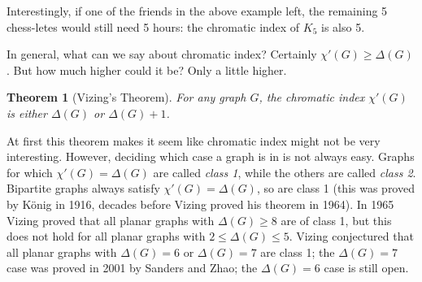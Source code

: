 \documentclass[10pt,]{book}
\theoremstyle{plain}
\newtheorem{theorem}{Theorem}[section]
\theoremstyle{definition}
\theoremstyle{definition}
\theoremstyle{definition}
\numberwithin{equation}{chapter}
\begin{document}
\hypertarget{p-405}{}%
Interestingly, if one of the friends in the above example left, the remaining 5 chess-letes would still need 5 hours: the chromatic index of \(K_5\) is also 5.%
\par
\hypertarget{p-406}{}%
In general, what can we say about chromatic index? Certainly \(\chi'(G) \ge \Delta(G)\). But how much higher could it be? Only a little higher.%
\begin{theorem}[{Vizing's Theorem}]\label{theorem-7}
\hypertarget{p-407}{}%
 For any graph \(G\), the chromatic index \(\chi'(G)\) is either \(\Delta(G)\) or \(\Delta(G) + 1\).%
\end{theorem}
\hypertarget{p-408}{}%
At first this theorem makes it seem like chromatic index might not be very interesting. However, deciding which case a graph is in is not always easy. Graphs for which \(\chi'(G) = \Delta(G)\) are called \emph{class 1}, while the others are called \emph{class 2}. Bipartite graphs always satisfy \(\chi'(G) = \Delta(G)\), so are class 1 (this was proved by König in 1916, decades before Vizing proved his theorem in 1964). In 1965 Vizing proved that all planar graphs with \(\Delta(G) \ge 8\) are of class 1, but this does not hold for all planar graphs with \(2 \le \Delta(G) \le 5\). Vizing conjectured that all planar graphs with \(\Delta(G) = 6\) or \(\Delta(G) = 7\) are class 1; the \(\Delta(G) = 7\) case was proved in 2001 by Sanders and Zhao; the \(\Delta(G) = 6\) case is still open.%
\typeout{************************************************}
\typeout{************************************************}
\end{document}
